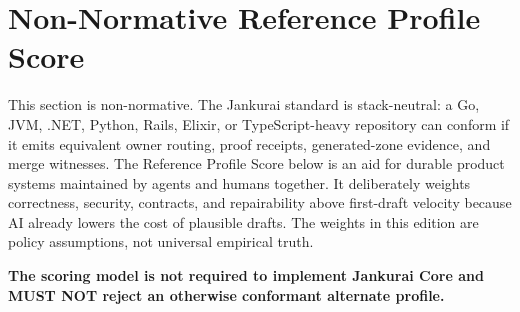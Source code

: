 \section{Non-Normative Reference Profile Score}

This section is non-normative. The Jankurai standard is stack-neutral: a Go, JVM, .NET, Python, Rails, Elixir, or TypeScript-heavy repository can conform if it emits equivalent owner routing, proof receipts, generated-zone evidence, and merge witnesses. The Reference Profile Score below is an aid for durable product systems maintained by agents and humans together. It deliberately weights correctness, security, contracts, and repairability above first-draft velocity because AI already lowers the cost of plausible drafts. The weights in this edition are policy assumptions, not universal empirical truth.

\textbf{The scoring model is not required to implement Jankurai Core and MUST NOT reject an otherwise conformant alternate profile.}

